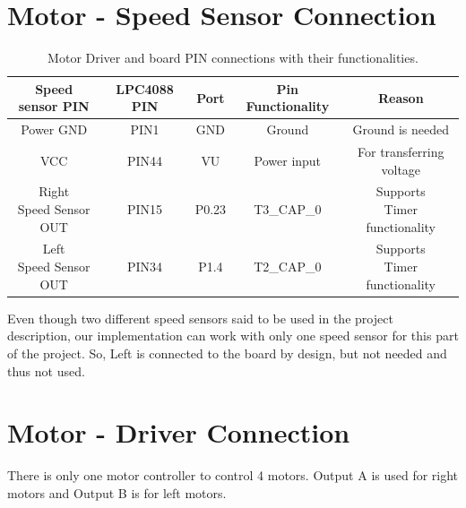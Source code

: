\documentclass[12pt]{article}
\begin{document}

\newpage
\section{Motor - Speed Sensor Connection}

\begin {table}[H]
\begin{center}
\begin{tabular}{|c|c|c|c|c|}
\hline
Speed sensor PIN & LPC4088 PIN & Port & Pin Functionality & Reason \\\hline
Power GND & PIN1 & GND & Ground & Ground is needed \\\hline
VCC & PIN44 & VU & Power input & For transferring voltage \\\hline
\shortstack{Right\\ Speed Sensor \\OUT} & PIN15 & P0.23 & T3\_CAP\_0 & \shortstack{Supports\\ Timer functionality} \\\hline
\shortstack{Left\\ Speed Sensor \\OUT} & PIN34 & P1.4 & T2\_CAP\_0 & \shortstack{Supports\\ Timer functionality} \\\hline
\end{tabular}
\caption{Motor Driver and board PIN connections with their functionalities.}
\end{center}
\end{table}

Even though two different speed sensors said to be used in the project description, our implementation can work with only one speed sensor for this part of the project. So, Left is connected to the board by design, but not needed and thus not used.


\newpage
\section{Motor - Driver Connection}

There is only one motor controller to control 4 motors. Output A is used for right motors and Output B is for left motors.
\end{document}
